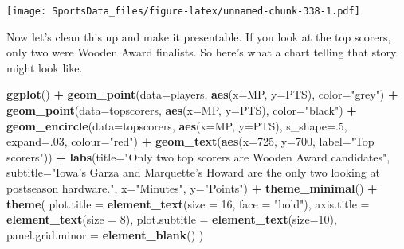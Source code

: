 \documentclass[]{book}
\newenvironment{Shaded}{\begin{snugshade}}{\end{snugshade}}
\newcommand{\DataTypeTok}[1]{\textcolor[rgb]{0.13,0.29,0.53}{#1}}
\newcommand{\DecValTok}[1]{\textcolor[rgb]{0.00,0.00,0.81}{#1}}
\newcommand{\KeywordTok}[1]{\textcolor[rgb]{0.13,0.29,0.53}{\textbf{#1}}}
\newcommand{\NormalTok}[1]{#1}
\newcommand{\OperatorTok}[1]{\textcolor[rgb]{0.81,0.36,0.00}{\textbf{#1}}}
\newcommand{\StringTok}[1]{\textcolor[rgb]{0.31,0.60,0.02}{#1}}
\begin{document}
\texttt{[image: SportsData\_files/figure-latex/unnamed-chunk-338-1.pdf]}

Now let's clean this up and make it presentable. If you look at the top scorers, only two were Wooden Award finalists. So here's what a chart telling that story might look like.

\begin{Shaded}
\begin{Highlighting}[]
\KeywordTok{ggplot}\NormalTok{() }\OperatorTok{+}\StringTok{ }
\StringTok{  }\KeywordTok{geom_point}\NormalTok{(}\DataTypeTok{data=}\NormalTok{players, }\KeywordTok{aes}\NormalTok{(}\DataTypeTok{x=}\NormalTok{MP, }\DataTypeTok{y=}\NormalTok{PTS), }\DataTypeTok{color=}\StringTok{"grey"}\NormalTok{) }\OperatorTok{+}\StringTok{ }
\StringTok{  }\KeywordTok{geom_point}\NormalTok{(}\DataTypeTok{data=}\NormalTok{topscorers, }\KeywordTok{aes}\NormalTok{(}\DataTypeTok{x=}\NormalTok{MP, }\DataTypeTok{y=}\NormalTok{PTS), }\DataTypeTok{color=}\StringTok{"black"}\NormalTok{) }\OperatorTok{+}\StringTok{ }
\StringTok{  }\KeywordTok{geom_encircle}\NormalTok{(}\DataTypeTok{data=}\NormalTok{topscorers, }\KeywordTok{aes}\NormalTok{(}\DataTypeTok{x=}\NormalTok{MP, }\DataTypeTok{y=}\NormalTok{PTS), }\DataTypeTok{s_shape=}\NormalTok{.}\DecValTok{5}\NormalTok{, }\DataTypeTok{expand=}\NormalTok{.}\DecValTok{03}\NormalTok{, }\DataTypeTok{colour=}\StringTok{"red"}\NormalTok{) }\OperatorTok{+}
\StringTok{  }\KeywordTok{geom_text}\NormalTok{(}\KeywordTok{aes}\NormalTok{(}\DataTypeTok{x=}\DecValTok{725}\NormalTok{, }\DataTypeTok{y=}\DecValTok{700}\NormalTok{, }\DataTypeTok{label=}\StringTok{"Top scorers"}\NormalTok{)) }\OperatorTok{+}\StringTok{ }
\StringTok{  }\KeywordTok{labs}\NormalTok{(}\DataTypeTok{title=}\StringTok{"Only two top scorers are Wooden Award candidates"}\NormalTok{, }\DataTypeTok{subtitle=}\StringTok{"Iowa's Garza and Marquette's Howard are the only two looking at postseason hardware."}\NormalTok{, }\DataTypeTok{x=}\StringTok{"Minutes"}\NormalTok{, }\DataTypeTok{y=}\StringTok{"Points"}\NormalTok{) }\OperatorTok{+}\StringTok{ }
\StringTok{  }\KeywordTok{theme_minimal}\NormalTok{() }\OperatorTok{+}\StringTok{ }
\StringTok{  }\KeywordTok{theme}\NormalTok{(}
    \DataTypeTok{plot.title =} \KeywordTok{element_text}\NormalTok{(}\DataTypeTok{size =} \DecValTok{16}\NormalTok{, }\DataTypeTok{face =} \StringTok{"bold"}\NormalTok{),}
    \DataTypeTok{axis.title =} \KeywordTok{element_text}\NormalTok{(}\DataTypeTok{size =} \DecValTok{8}\NormalTok{), }
    \DataTypeTok{plot.subtitle =} \KeywordTok{element_text}\NormalTok{(}\DataTypeTok{size=}\DecValTok{10}\NormalTok{), }
    \DataTypeTok{panel.grid.minor =} \KeywordTok{element_blank}\NormalTok{()}
\NormalTok{    )}
\end{Highlighting}
\end{Shaded}
\end{document}
